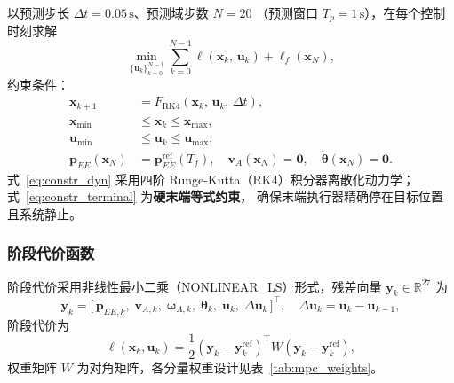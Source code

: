 以预测步长 $\Delta t = 0.05\,\mathrm{s}$、预测域步数 $N = 20$
（预测窗口 $T_p = 1\,\mathrm{s}$），在每个控制时刻求解
\begin{equation}
    \min_{\{\mathbf{u}_k\}_{k=0}^{N-1}}
    \sum_{k=0}^{N-1} \ell(\mathbf{x}_k,\,\mathbf{u}_k)
    + \ell_f(\mathbf{x}_N),
    \label{eq:ocp}
\end{equation}
约束条件：
\begin{align}
    \mathbf{x}_{k+1} &= F_{\mathrm{RK4}}(\mathbf{x}_k,\,\mathbf{u}_k,\,\Delta t),
    \label{eq:constr_dyn}\\
    \mathbf{x}_{\min} &\leq \mathbf{x}_k \leq \mathbf{x}_{\max},
    \label{eq:constr_state}\\
    \mathbf{u}_{\min} &\leq \mathbf{u}_k \leq \mathbf{u}_{\max},
    \label{eq:constr_input}\\
    \mathbf{p}_{EE}(\mathbf{x}_N) &= \mathbf{p}^{\mathrm{ref}}_{EE}(T_f),\quad
    \mathbf{v}_A(\mathbf{x}_N) = \mathbf{0},\quad
    \dot{\boldsymbol{\theta}}(\mathbf{x}_N) = \mathbf{0}.
    \label{eq:constr_terminal}
\end{align}
式~\eqref{eq:constr_dyn} 采用四阶 Runge-Kutta（RK4）积分器离散化动力学；
式~\eqref{eq:constr_terminal} 为\textbf{硬末端等式约束}，
确保末端执行器精确停在目标位置且系统静止。

\subsubsection{阶段代价函数}

阶段代价采用非线性最小二乘（NONLINEAR\_LS）形式，残差向量
$\mathbf{y}_k\in\mathbb{R}^{27}$ 为
\begin{equation}
    \mathbf{y}_k =
    \bigl[\,
        \mathbf{p}_{EE,k},\;
        \mathbf{v}_{A,k},\;
        \boldsymbol{\omega}_{A,k},\;
        \boldsymbol{\theta}_k,\;
        \mathbf{u}_k,\;
        \Delta\mathbf{u}_k
    \,\bigr]^\top,
    \quad
    \Delta\mathbf{u}_k = \mathbf{u}_k - \mathbf{u}_{k-1},
\end{equation}
阶段代价为
\begin{equation}
    \ell(\mathbf{x}_k,\mathbf{u}_k)
    = \frac{1}{2}(\mathbf{y}_k - \mathbf{y}_k^{\mathrm{ref}})^\top W
      (\mathbf{y}_k - \mathbf{y}_k^{\mathrm{ref}}),
    \label{eq:stage_cost}
\end{equation}
权重矩阵 $W$ 为对角矩阵，各分量权重设计见表~\ref{tab:mpc_weights}。

